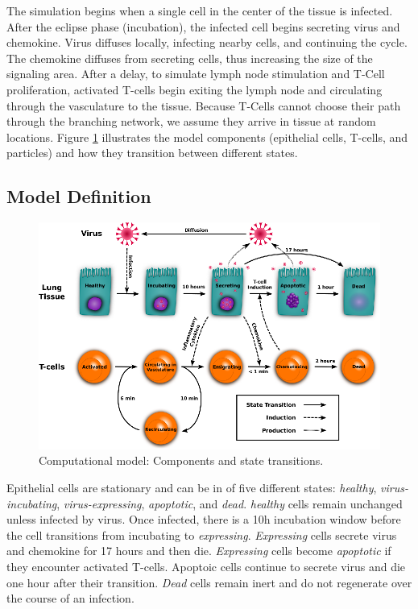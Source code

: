 \documentclass[10pt]{article}
\begin{document}
The simulation begins when a single cell in the center of the tissue is infected. After the eclipse phase (incubation), the infected cell begins secreting virus and chemokine. Virus diffuses locally, infecting nearby cells, and continuing the cycle. The chemokine diffuses from secreting cells, thus increasing the size of the signaling area. After a delay, to simulate lymph node stimulation and T-Cell proliferation, activated T-cells begin exiting the lymph node and circulating through the vasculature to the tissue. Because T-Cells cannot choose their path through the branching network, we assume they arrive in tissue at random locations. Figure \ref{fig:modelchart} illustrates the model components 
(epithelial cells, T-cells, and particles) and how they transition between different states.


\subsection*{Model Definition}

\begin{figure}[ht!]
\begin{center}
\includegraphics[width=\textwidth]{ModelChart}
\end{center}
\caption{Computational model: Components and state transitions.}
\label{fig:modelchart}
\end{figure}

Epithelial cells are stationary and can be in of five different states: \emph{healthy}, \emph{virus-incubating}, \emph{virus-expressing}, \emph{apoptotic}, and \emph{dead}. \emph{healthy} cells remain unchanged unless infected by virus. Once infected, there is a 10h incubation window before the cell transitions from {incubating} to \emph{expressing}. \emph{Expressing} cells secrete virus and chemokine for 17 hours and then die. \emph{Expressing} cells become \emph{apoptotic} if they encounter activated T-cells. Apoptoic cells continue to secrete virus and die one hour after their transition. \emph{Dead} cells remain inert and do not regenerate over the course of an infection.
\end{document}
